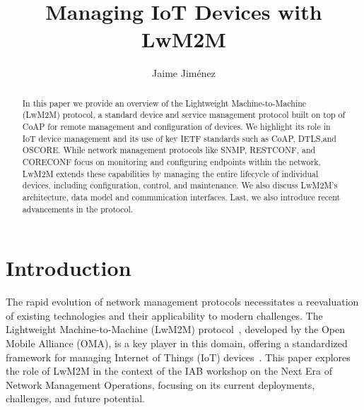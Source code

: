 \documentclass[11pt,sigconf]{iabart}
\begin{document}
\title{Managing IoT Devices with LwM2M}

\author{Jaime Jiménez}

\begin{abstract}

In this paper we provide an overview of the Lightweight Machine-to-Machine (LwM2M) protocol, a standard device and service management protocol built on top of CoAP for remote management and configuration of devices. We highlight its role in IoT device management and its use of key IETF standards such as CoAP, DTLS,and OSCORE. While network management protocols like SNMP, RESTCONF, and CORECONF focus on monitoring and configuring endpoints within the network, LwM2M extends these capabilities by managing the entire lifecycle of individual devices, including configuration, control, and maintenance. We also discuss LwM2M's architecture, data model and communication interfaces. Last, we also introduce recent advancements in the protocol.
  
\end{abstract}


\maketitle

\section{Introduction} \label{introduction}



The rapid evolution of network management protocols necessitates a reevaluation of existing technologies and their applicability to modern challenges. The Lightweight Machine-to-Machine (LwM2M) protocol~\cite{lwm2m-spec}, developed by the Open Mobile Alliance (OMA), is a key player in this domain, offering a standardized framework for managing Internet of Things (IoT) devices~\cite{oma-sdo}. This paper explores the role of LwM2M in the context of the IAB workshop on the Next Era of Network Management Operations, focusing on its current deployments, challenges, and future potential.
\end{document}
